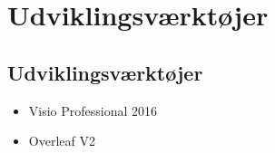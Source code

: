 \chapter{Udviklingsværktøjer}


\section{Udviklingsværktøjer}

\begin{itemize}
    \item Visio Professional 2016
    \item Overleaf V2
\end{itemize}
